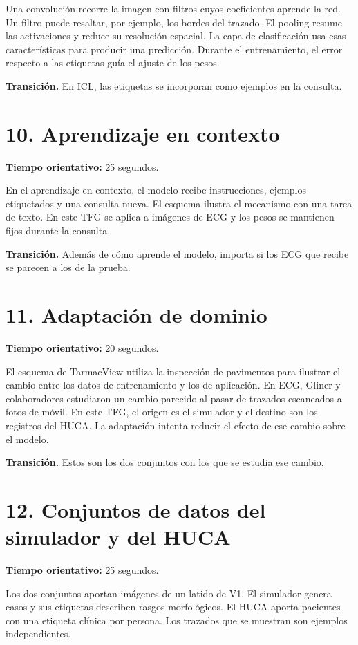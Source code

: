 \documentclass[11pt,a4paper]{article}
\begin{document}
Una convolución recorre la imagen con filtros cuyos coeficientes aprende la red. Un filtro puede resaltar, por ejemplo, los bordes del trazado. El pooling resume las activaciones y reduce su resolución espacial. La capa de clasificación usa esas características para producir una predicción. Durante el entrenamiento, el error respecto a las etiquetas guía el ajuste de los pesos.

\textbf{Transición.} En ICL, las etiquetas se incorporan como ejemplos en la consulta.

\section*{10. Aprendizaje en contexto}
\textbf{Tiempo orientativo: }25 segundos.

En el aprendizaje en contexto, el modelo recibe instrucciones, ejemplos etiquetados y una consulta nueva. El esquema ilustra el mecanismo con una tarea de texto. En este TFG se aplica a imágenes de ECG y los pesos se mantienen fijos durante la consulta.

\textbf{Transición.} Además de cómo aprende el modelo, importa si los ECG que recibe se parecen a los de la prueba.

\section*{11. Adaptación de dominio}
\textbf{Tiempo orientativo: }20 segundos.

El esquema de TarmacView utiliza la inspección de pavimentos para ilustrar el cambio entre los datos de entrenamiento y los de aplicación. En ECG, Gliner y colaboradores estudiaron un cambio parecido al pasar de trazados escaneados a fotos de móvil. En este TFG, el origen es el simulador y el destino son los registros del HUCA. La adaptación intenta reducir el efecto de ese cambio sobre el modelo.

\textbf{Transición.} Estos son los dos conjuntos con los que se estudia ese cambio.

\section*{12. Conjuntos de datos del simulador y del HUCA}
\textbf{Tiempo orientativo: }25 segundos.

Los dos conjuntos aportan imágenes de un latido de V1. El simulador genera \SimPatients{} casos y sus etiquetas describen rasgos morfológicos. El HUCA aporta \HucaPatients{} pacientes con una etiqueta clínica por persona. Los trazados que se muestran son ejemplos independientes.
\end{document}
